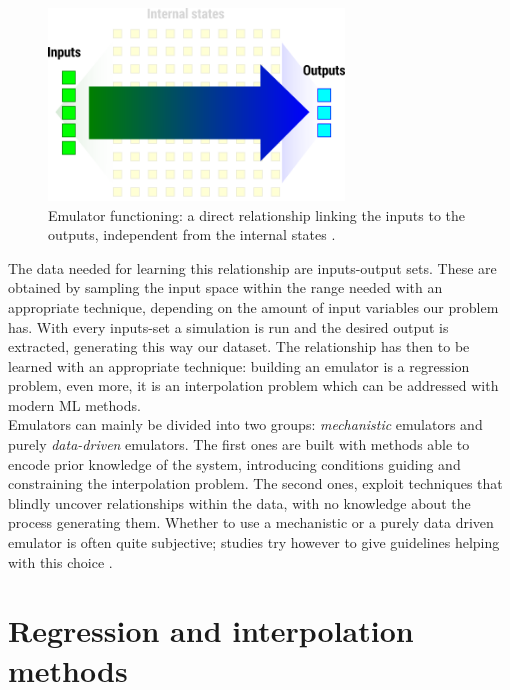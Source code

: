 \begin{figure}[h]
  \centering
  \includegraphics[width=0.7\textwidth]{Figures/emulation.png}
  \caption{Emulator functioning: a direct relationship linking the inputs to the outputs, independent from the internal states \autocite{carbajal_emumore_2017}.}
  \label{fig:emulation}
\end{figure}

The data needed for learning this relationship are inputs-output sets.
These are obtained by sampling the input space within the range needed with an appropriate technique, depending on the amount of input variables our problem has.
With every inputs-set a simulation is run and the desired output is extracted, generating this way our dataset.
The relationship has then to be learned with an appropriate technique: building an emulator is a regression problem, even more, it is an interpolation problem \autocite{carbajal_emumore_2017} which can be addressed with modern ML methods.\\

Emulators can mainly be divided into two groups: \emph{mechanistic} emulators and purely \emph{data-driven} emulators.
The first ones are built with methods able to encode prior knowledge of the system, introducing conditions guiding and constraining the interpolation problem.
The second ones, exploit techniques that blindly uncover relationships within the data, with no knowledge about the process generating them.
Whether to use a mechanistic or a purely data driven emulator is often quite subjective; studies try however to give guidelines helping with this choice \autocite{carbajal_appraisal_2016}.



\section{Regression and interpolation methods}

